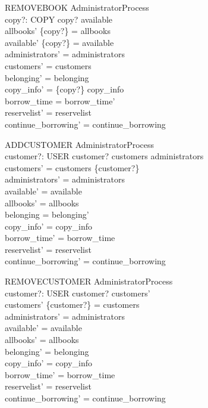 \begin{schema}{REMOVEBOOK}
  AdministratorProcess\\
  copy?: COPY
\where
  copy? \in  available\\
  allbooks' \cup  \{copy?\} = allbooks\\
  available' \cup  \{copy?\} = available\\
  administrators' = administrators\\
  customers' = customers\\
  belonging' = belonging\\
  copy\_info' = \{copy?\} \ndres  copy\_info\\
  borrow\_time = borrow\_time'\\
  reservelist' = reservelist\\
  continue\_borrowing' = continue\_borrowing
\end{schema}

\begin{schema}{ADDCUSTOMER}
  AdministratorProcess\\
  customer?: USER
\where
  customer? \notin  customers \cup  administrators\\
  customers' = customers \cup  \{customer?\}\\
  administrators' = administrators\\
  available' = available\\
  allbooks' = allbooks\\
  belonging = belonging'\\
  copy\_info' = copy\_info\\
  borrow\_time' = borrow\_time\\
  reservelist' = reservelist\\
  continue\_borrowing' = continue\_borrowing
\end{schema}

\begin{schema}{REMOVECUSTOMER}
  AdministratorProcess\\
  customer?: USER
\where
  customer? \in  customers'\\
  customers' \cup  \{customer?\} = customers\\
  administrators' = administrators\\
  available' = available\\
  allbooks' = allbooks\\
  belonging' = belonging\\
  copy\_info' = copy\_info\\
  borrow\_time' = borrow\_time\\
  reservelist' = reservelist\\
  continue\_borrowing' = continue\_borrowing
\end{schema}

